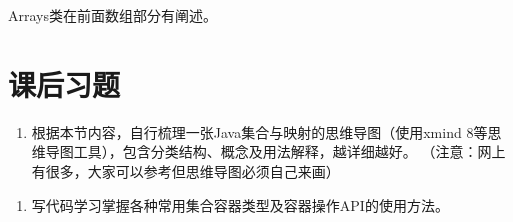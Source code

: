 
Arrays类在前面数组部分有阐述。



\section{课后习题}


\begin{enumerate}
\item 根据本节内容，自行梳理一张Java集合与映射的思维导图（使用xmind
  8等思维导图工具），包含分类结构、概念及用法解释，越详细越好。{\kai
    （注意：网上有很多，大家可以参考但思维导图必须自己来画）}
\end{enumerate}


\begin{enumerate}
\item 写代码学习掌握各种常用集合容器类型及容器操作API的使用方法。
\end{enumerate}
